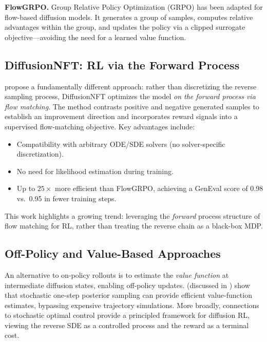 \documentclass[11pt]{article}
\begin{document}
\textbf{FlowGRPO.}
Group Relative Policy Optimization (GRPO) \citep{shao2024deepseekmath} has been adapted for flow-based diffusion models.
It generates a group of samples, computes relative advantages within the group, and updates the policy via a clipped surrogate objective---avoiding the need for a learned value function.

\subsection{DiffusionNFT: RL via the Forward Process}

\citet{zheng2025diffusionnft} propose a fundamentally different approach: rather than discretizing the reverse sampling process, DiffusionNFT optimizes the model \emph{on the forward process via flow matching}.
The method contrasts positive and negative generated samples to establish an improvement direction and incorporates reward signals into a supervised flow-matching objective.
Key advantages include:
\begin{itemize}
    \item Compatibility with arbitrary ODE/SDE solvers (no solver-specific discretization).
    \item No need for likelihood estimation during training.
    \item Up to $25\times$ more efficient than FlowGRPO, achieving a GenEval score of 0.98 vs.\ 0.95 in fewer training steps.
\end{itemize}
This work highlights a growing trend: leveraging the \emph{forward} process structure of flow matching for RL, rather than treating the reverse chain as a black-box MDP.

\subsection{Off-Policy and Value-Based Approaches}

An alternative to on-policy rollouts is to estimate the \emph{value function} at intermediate diffusion states, enabling off-policy updates.
\citet{potaptchik2026meta} (discussed in ) show that stochastic one-step posterior sampling can provide efficient value-function estimates, bypassing expensive trajectory simulations.
More broadly, connections to stochastic optimal control \citep{uehara2024finetuning,berner2022optimal} provide a principled framework for diffusion RL, viewing the reverse SDE as a controlled process and the reward as a terminal cost.
\end{document}
